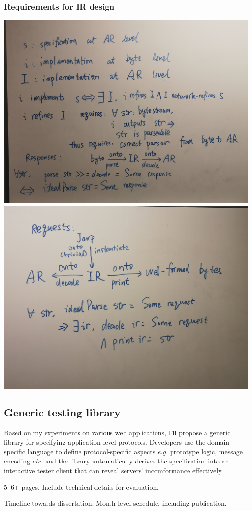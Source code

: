 \documentclass{article}
\theoremstyle{definition}
\begin{document}
\subsubsection{Requirements for IR design}
\includegraphics[width=\textwidth]{figures/ir-parse}
\includegraphics[width=\textwidth]{figures/ir-print}

\subsection{Generic testing library}
Based on my experiments on various web applications, I'll propose a generic
library for specifying application-level protocols.  Developers use the
domain-specific language to define protocol-specific aspects {\it e.g.}
prototype logic, message encoding {\it etc.}  and the library automatically
derives the specification into an interactive tester client that can reveal
servers' incomformance effectively.

5--6+ pages.  Include technical details for evaluation.

Timeline towards dissertation.  Month-level schedule, including publication.

\printbibliography
\end{document}
